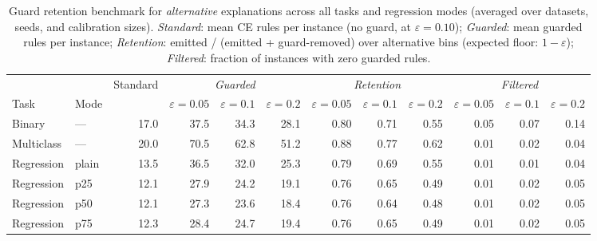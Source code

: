 \begin{table}[ht]
\centering
\footnotesize
\caption{Guard retention benchmark for \textit{alternative} explanations across all tasks and regression modes (averaged over datasets, seeds, and calibration sizes). \textit{Standard}: mean CE rules per instance (no guard, at $\varepsilon=0.10$); \textit{Guarded}: mean guarded rules per instance; \textit{Retention}: emitted / (emitted + guard-removed) over alternative bins (expected floor: $1-\varepsilon$); \textit{Filtered}: fraction of instances with zero guarded rules.}
\label{tab:guarded_scenario_c_alternative}
\begin{tabular}{ll r|rrr|rrr|rrr}
\toprule
\multicolumn{2}{l}{} & \multicolumn{1}{c}{Standard} & \multicolumn{3}{c|}{\textit{Guarded}} & \multicolumn{3}{c|}{\textit{Retention}} & \multicolumn{3}{c}{\textit{Filtered}} \\
Task & Mode &  & $\varepsilon\!=\!0.05$ & $\varepsilon\!=\!0.1$ & $\varepsilon\!=\!0.2$ & $\varepsilon\!=\!0.05$ & $\varepsilon\!=\!0.1$ & $\varepsilon\!=\!0.2$ & $\varepsilon\!=\!0.05$ & $\varepsilon\!=\!0.1$ & $\varepsilon\!=\!0.2$ \\
\midrule
Binary & --- & 17.0 & 37.5 & 34.3 & 28.1 & 0.80 & 0.71 & 0.55 & 0.05 & 0.07 & 0.14 \\
Multiclass & --- & 20.0 & 70.5 & 62.8 & 51.2 & 0.88 & 0.77 & 0.62 & 0.01 & 0.02 & 0.04 \\
\midrule
Regression & plain & 13.5 & 36.5 & 32.0 & 25.3 & 0.79 & 0.69 & 0.55 & 0.01 & 0.01 & 0.04 \\
Regression & p25 & 12.1 & 27.9 & 24.2 & 19.1 & 0.76 & 0.65 & 0.49 & 0.01 & 0.02 & 0.05 \\
Regression & p50 & 12.1 & 27.3 & 23.6 & 18.4 & 0.76 & 0.64 & 0.48 & 0.01 & 0.02 & 0.05 \\
Regression & p75 & 12.3 & 28.4 & 24.7 & 19.4 & 0.76 & 0.65 & 0.49 & 0.01 & 0.02 & 0.05 \\
\bottomrule
\end{tabular}
\end{table}
